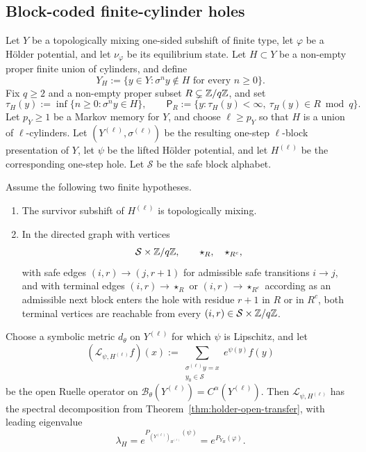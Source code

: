 \subsection{Block-coded finite-cylinder holes}

\begin{theorem}
\label{thm:holder-finite-cylinder-escape}
Let \(Y\) be a topologically mixing one-sided subshift of finite type,
let \(\varphi\) be a H\"older potential, and let \(\nu_\varphi\) be its
equilibrium state.  Let \(H\subset Y\) be a non-empty proper finite union
of cylinders, and define
\[
  Y_H:=\{y\in Y:\sigma^n y\notin H\text{ for every }n\geq0\}.
\]
Fix \(q\geq 2\) and a non-empty proper subset
\(R\subsetneq \mathbb{Z}/q\mathbb{Z}\), and set
\[
  \tau_H(y):=\inf\{n\geq0:\sigma^n y\in H\},
  \qquad
  \mathsf P_R:=\{y:\tau_H(y)<\infty,\ \tau_H(y)\in R\bmod q\}.
\]
Let \(p_Y\geq1\) be a Markov memory for \(Y\), and choose
\(\ell\geq p_Y\) so that \(H\) is a union of \(\ell\)-cylinders.  Let
\((Y^{(\ell)},\sigma^{(\ell)})\) be the resulting one-step
\(\ell\)-block presentation of \(Y\), let \(\psi\) be the lifted
H\"older potential, and let \(H^{(\ell)}\) be the corresponding one-step
hole.  Let
\(\mathcal S\) be the safe block alphabet.

Assume the following two finite hypotheses.
\begin{enumerate}[label=(G\arabic*)]
  \item The survivor subshift of \(H^{(\ell)}\) is topologically mixing.
  \item In the directed graph with vertices
\[
  \mathcal S\times\mathbb{Z}/q\mathbb{Z},\qquad \star_R,\quad\star_{R^c},
\]
with safe edges
\((i,r)\to(j,r+1)\) for admissible safe transitions \(i\to j\), and with
terminal edges \((i,r)\to\star_R\) or \((i,r)\to\star_{R^c}\) according
as an admissible next block enters the hole with residue \(r+1\) in
\(R\) or in \(R^c\), both terminal vertices are reachable from every
\((i,r)\in\mathcal S\times\mathbb{Z}/q\mathbb{Z}\).
\end{enumerate}

Choose a symbolic metric \(d_\theta\) on \(Y^{(\ell)}\) for which
\(\psi\) is Lipschitz, and let
\[
  (\mathcal L_{\psi,H^{(\ell)}}f)(x)
  :=
  \sum_{\substack{\sigma^{(\ell)} y=x\\ y_0\in\mathcal S}}
    e^{\psi(y)}f(y)
\]
be the open Ruelle operator on
\(\mathcal B_\theta(Y^{(\ell)})=C^\alpha(Y^{(\ell)})\).  Then
\(\mathcal L_{\psi,H^{(\ell)}}\) has the spectral decomposition from
Theorem~\ref{thm:holder-open-transfer}, with leading eigenvalue
\[
  \lambda_H
  =
  e^{P_{(Y^{(\ell)})_{H^{(\ell)}}}(\psi)}
  =
  e^{P_{Y_H}(\varphi)}.
\]


\end{theorem}
